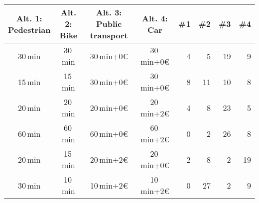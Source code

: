 \documentclass{article}
\begin{document}

\vspace{1em}

\begin{center}
{\huge
\begin{tabular}{|c|c|c|c||r|r|r|r|}
\hline 
  \myBox{3em}{Alt. 1:\\Pe\-des\-tri\-an} &
  \myBox{3em}{Alt. 2:\\Bike} &
  \myBox{3em}{Alt. 3:\\ Public transport} &
  \myBox{3em}{Alt. 4:\\ Car} &
  \#1 & \#2 & \#3 & \#4 \\ \hline\hline
30\,min & 30\,min & 30\,min+0\euro{} & 30\,min+0\euro{}
   &  4 &  5 & 19 &  9 \\[0.5em] \hline
15\,min & 15\,min & 30\,min+0\euro{} & 30\,min+0\euro{}
   &  8 & 11 & 10 &  8 \\[0.5em] \hline
20\,min & 20\,min & 20\,min+0\euro{} & 20\,min+2\euro{}
   &  4 &  8 & 23 &  5 \\[0.5em] \hline
60\,min & 60\,min & 60\,min+0\euro{} & 60\,min+2\euro{}
   &  0 &  2 & 26 &  8 \\[0.5em] \hline
20\,min & 15\,min & 20\,min+2\euro{} & 20\,min+0\euro{}
   &  2 &  8 &  2 & 19 \\[0.5em] \hline
30\,min & 10\,min & 10\,min+2\euro{} & 10\,min+2\euro{}
   &  0 & 27 &  2 &  9 \\[0.5em] \hline
\end{tabular}
}
\end{center}
\end{document}
